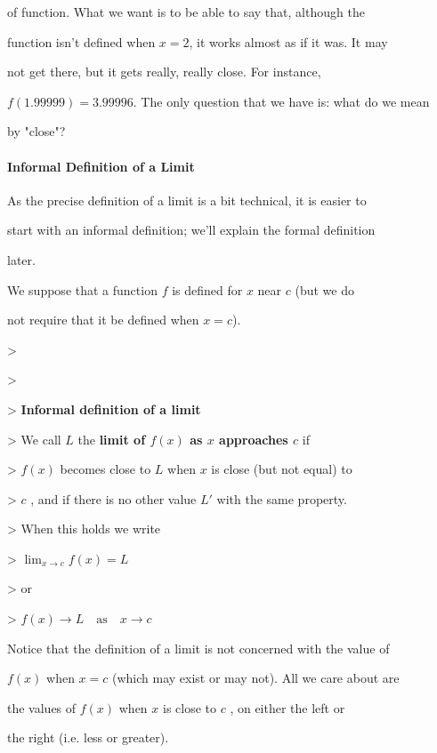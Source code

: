 of function. What we want is to be able to say that, although the

function isn't defined when $x=2$, it works almost as if it was. It may

not get there, but it gets really, really close. For instance,

$f(1.99999)=3.99996$. The only question that we have is: what do we mean

by "close"?



\paragraph{Informal Definition of a Limit}



As the precise definition of a limit is a bit technical, it is easier to

start with an informal definition; we'll explain the formal definition

later.



We suppose that a function $f$ is defined for $x$ near $c$ (but we do

not require that it be defined when $x=c$).



> 

>

>    \textbf{Informal definition of a limit}

>    We call $L$ the \textbf{limit of $f(x)$ as $x$ approaches $c$} if

>     $f(x)$ becomes close to $L$ when $x$ is close (but not equal) to

>     $c$ , and if there is no other value $L'$ with the same property.

>    When this holds we write

>    $\lim_{x\to c}f(x)=L$

>    or

>    $f(x)\to L\quad\text{as}\quad x\to c$



Notice that the definition of a limit is not concerned with the value of

$f(x)$ when $x=c$ (which may exist or may not). All we care about are

the values of $f(x)$ when $x$ is close to $c$ , on either the left or

the right (i.e. less or greater).



